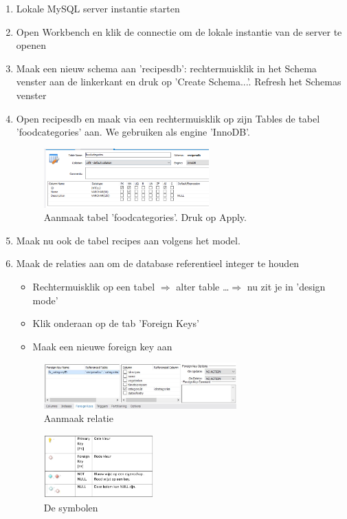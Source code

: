 \documentclass{article}
\begin{document}
\begin{enumerate}
    \item Lokale MySQL server instantie starten
    \item Open Workbench en klik de connectie om de lokale instantie van de server te openen
    \item Maak een nieuw schema aan 'recipesdb': rechtermuisklik in het Schema venster aan de linkerkant en druk op 'Create Schema...'. Refresh het Schemas venster
    \item Open recipesdb en maak via een rechtermuisklik op zijn Tables de tabel 'foodcategories' aan. We gebruiken als engine 'InnoDB'.

    \begin{figure}[H]
        \centering
        \includegraphics[width=0.6\textwidth]{stappenplan-1.png}
        \caption{Aanmaak tabel 'foodcategories'. Druk op Apply.}
    \end{figure}

    \item Maak nu ook de tabel recipes aan volgens het model.
    \item Maak de relaties aan om de database referentieel integer te houden
    \begin{itemize}
        \item Rechtermuisklik op een tabel $\Rightarrow$ alter table \dots $\Rightarrow$ nu zit je in 'design mode'
        \item Klik onderaan op de tab 'Foreign Keys'
        \item Maak een nieuwe foreign key aan
    \end{itemize}

    \begin{figure}[H]
        \centering
        \includegraphics[width=0.7\textwidth]{stappenplan-2.png}
        \caption{Aanmaak relatie}
    \end{figure}

    \begin{figure}[H]
        \centering
        \includegraphics[width=0.4\textwidth]{symbolen.png}
        \caption{De symbolen}
    \end{figure}


\end{enumerate}
\end{document}
